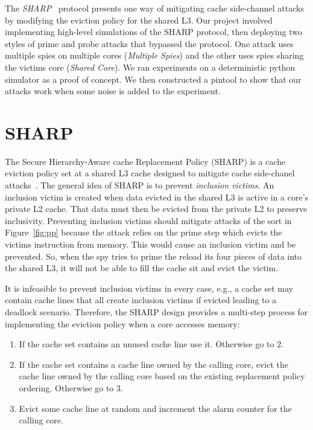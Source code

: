 \documentclass[12pt]{article}
\begin{document}
The {\it SHARP}~\cite{sharp} protocol presents one way of mitigating cache side-channel attacks by modifying the eviction policy for the shared L3.
Our project involved implementing high-level simulations of the SHARP protocol, 
then deploying two styles of prime and probe attacks that bypassed the protocol.
One attack uses multiple spies on multiple cores ({\it Multiple Spies}) and the other uses spies sharing the victims core ({\it Shared Core}).
We ran experiments on a deterministic python simulator as a proof of concept.
We then constructed a pintool to show that our attacks work when some noise is added to the experiment.


\section{SHARP}

The Secure Hierarchy-Aware cache Replacement Policy (SHARP) is a cache eviction policy set at a shared L3 cache designed to mitigate cache side-chanel attacks~\cite{sharp}.
The general idea of SHARP is to prevent {\it inclusion victims}.
An inclusion victim is created when data evicted in the shared L3 is active in a core's private L2 cache.
That data must then be evicted from the private L2 to preserve inclusivity.
Preventing inclusion victims should mitigate attacks of the sort in Figure~\ref{fig:pp} because the attack relies on the prime step which evicts the victims instruction from memory.
This would cause an inclusion victim and be prevented.
So, when the spy tries to prime the reload its four pieces of data into the shared L3,
it will not be able to fill the cache sit and evict the victim.

It is infeasible to prevent inclusion victims in every case, e.g., a cache set may contain cache lines that all create inclusion victims if evicted leading to a deadlock scenario.
Therefore, the SHARP design provides a multi-step process for implementing the eviction policy when a core accesses memory:

\begin{enumerate}

\item If the cache set contains an unused cache line use it. Otherwise go to $2$.
\item If the cache set contains a cache line owned by the calling core, evict the cache line owned by the calling core based on the existing replacement policy ordering. Otherwise go to $3$.
\item Evict some cache line at random and increment the alarm counter for the calling core.

\end{enumerate}
\end{document}
